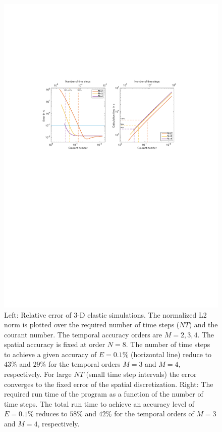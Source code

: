 \documentclass[11pt,onecolumn,oneside]{article}
\begin{document}
\begin{figure}[ph]
\centerline{\includegraphics[width=\textwidth]{eps/error_3D_courant}}
\caption{Left: Relative error of 3-D elastic simulations. 
The normalized L2 norm is plotted over the required number of time steps ($NT$) and the courant number. The temporal accuracy orders are $M=2,3,4$. The spatial accuracy is fixed at order $N=8$. 
The number of time steps to achieve a given accuracy of $E=0.1\%$ (horizontal line) reduce to $43\%$ and $29\%$ for the temporal orders $M=3$ and $M=4$, respectively. 
For large $NT$ (small time step intervals) the error converges to the fixed error of the spatial discretization. Right: The required run time  of the program as a function of the number of
time steps. The total run time to achieve an accuracy level of $E=0.1\%$ reduces to $58\%$ and $42\%$ for the temporal orders of $M=3$ and $M=4$, respectively.}
\label{fig_L23D}
\end{figure}
\end{document}
